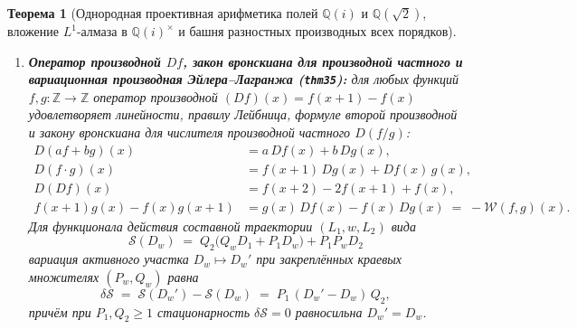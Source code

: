 \documentclass[11pt,a4paper]{article}
\theoremstyle{plain}
\newtheorem{theorem}{Теорема}[section]
\theoremstyle{definition}
\begin{document}
\begin{theorem}[Однородная проективная арифметика полей $\mathbb{Q}(i)$ и $\mathbb{Q}(\sqrt{2})$, вложение $L^1$-алмаза в $\mathbb{Q}(i)^\times$ и башня разностных производных всех порядков]
\begin{enumerate}[label=\textbf{(\roman*)},leftmargin=*]
\item \textbf{Оператор производной $Df$, закон вронскиана для производной частного и вариационная производная Эйлера--Лагранжа (\texttt{thm35}):}
  для любых функций $f, g\colon \mathbb{Z} \to \mathbb{Z}$ оператор производной $(Df)(x) = f(x+1) - f(x)$ удовлетворяет линейности, правилу Лейбница, формуле второй производной и закону вронскиана для числителя производной частного $D(f/g)$:
  \begin{align}
    D(af + bg)(x) &= a\,Df(x) + b\,Dg(x), \label{eq:deriv-lin} \\
    D(f\cdot g)(x) &= f(x+1)\,Dg(x) + Df(x)\,g(x), \label{eq:deriv-leibniz} \\
    D(Df)(x) &= f(x+2) - 2f(x+1) + f(x), \label{eq:deriv-second} \\
    f(x+1)g(x) - f(x)g(x+1) &= g(x)\,Df(x) - f(x)\,Dg(x) \;=\; -\mathcal{W}(f, g)(x). \label{eq:deriv-quotient-wronskian}
  \end{align}
  Для функционала действия составной траектории $(L_1, w, L_2)$ вида
  \begin{equation}
    \label{eq:cascade-action-def}
    \mathcal{S}(D_w) \;=\; Q_2\bigl(Q_w D_1 + P_1 D_w\bigr) + P_1 P_w D_2
  \end{equation}
  вариация активного участка $D_w \mapsto D_w'$ при закреплённых краевых множителях $(P_w, Q_w)$ равна
  \begin{equation}
    \label{eq:variational-euler-lagrange}
    \delta\mathcal{S} \;=\; \mathcal{S}(D_w') - \mathcal{S}(D_w) \;=\; P_1\,(D_w' - D_w)\,Q_2,
  \end{equation}
  причём при $P_1, Q_2 \ge 1$ стационарность $\delta\mathcal{S} = 0$ равносильна $D_w' = D_w$.


\end{enumerate}
\end{theorem}
\end{document}
